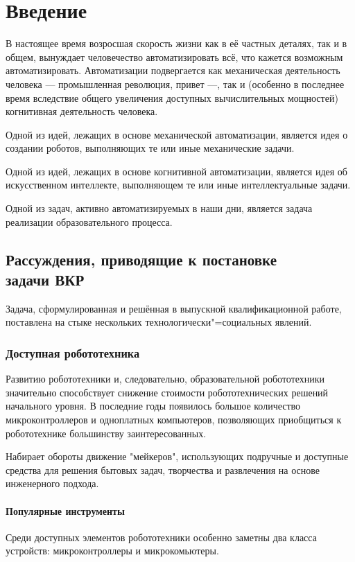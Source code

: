 \chapter{Введение}

В настоящее время возросшая скорость жизни как в её частных деталях, так и в общем, вынуждает человечество автоматизировать всё, что кажется возможным автоматизировать. Автоматизации подвергается как механическая деятельность человека --- промышленная революция, привет ---, так и (особенно в последнее время вследствие общего увеличения доступных вычислительных мощностей) когнитивная деятельность человека.

Одной из идей, лежащих в основе механической автоматизации, является идея о создании роботов, выполняющих те или иные механические задачи.

Одной из идей, лежащих в основе когнитивной автоматизации, является идея об искусственном интеллекте, выполняющем те или иные интеллектуальные задачи.

Одной из задач, активно автоматизируемых в наши дни, является задача реализации образовательного процесса.

\section{Рассуждения, приводящие к постановке\\ задачи ВКР}
Задача, сформулированная и решённая в выпускной квалификационной работе, поставлена на стыке нескольких технологически"=социальных явлений.

\subsection{Доступная робототехника}
Развитию робототехники и, следовательно, образовательной робототехники значительно способствует снижение стоимости робототехнических решений начального уровня. В последние годы появилось большое количество микроконтроллеров и одноплатных компьютеров, позволяющих приобщиться к робототехнике большинству заинтересованных.

Набирает обороты движение "мейкеров", использующих подручные и доступные средства для решения бытовых задач, творчества и развлечения на основе инженерного подхода.

\subsubsection{Популярные инструменты} \label{popular-instruments}
Среди доступных элементов робототехники особенно заметны два класса устройств: микроконтроллеры и микрокомьютеры.


